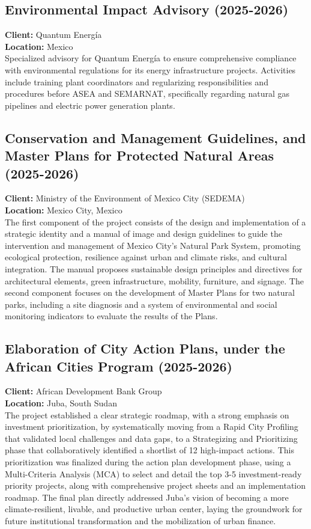 \documentclass[
	a4paper,
	12pt,
	unnumberedsections,
]{CSSullivanBusinessReport}
\begin{document}
\subsection{Environmental Impact Advisory (2025-2026)}
\textbf{Client:} Quantum Energía\\
\textbf{Location:} Mexico\\[0.5em]
Specialized advisory for Quantum Energía to ensure comprehensive compliance with environmental regulations for its energy infrastructure projects. Activities include training plant coordinators and regularizing responsibilities and procedures before ASEA and SEMARNAT, specifically regarding natural gas pipelines and electric power generation plants.

\subsection{Conservation and Management Guidelines, and Master Plans for Protected Natural Areas (2025-2026)}
\textbf{Client:} Ministry of the Environment of Mexico City (SEDEMA)\\
\textbf{Location:} Mexico City, Mexico\\[0.5em]
The first component of the project consists of the design and implementation of a strategic identity and a manual of image and design guidelines to guide the intervention and management of Mexico City’s Natural Park System, promoting ecological protection, resilience against urban and climate risks, and cultural integration. The manual proposes sustainable design principles and directives for architectural elements, green infrastructure, mobility, furniture, and signage. The second component focuses on the development of Master Plans for two natural parks, including a site diagnosis and a system of environmental and social monitoring indicators to evaluate the results of the Plans.

\subsection{Elaboration of City Action Plans, under the African Cities Program (2025-2026)}
\textbf{Client:}  African Development Bank Group \\
\textbf{Location:}   Juba, South Sudan \\[0.5em]
 The project established a clear strategic roadmap, with a strong emphasis on investment prioritization, by systematically moving from a Rapid City Profiling that validated local challenges and data gaps, to a Strategizing and Prioritizing phase that collaboratively identified a shortlist of 12 high-impact actions. This prioritization was finalized during the action plan development phase, using a Multi-Criteria Analysis (MCA) to select and detail the top 3-5 investment-ready priority projects, along with comprehensive project sheets and an implementation roadmap. The final plan directly addressed Juba’s vision of becoming a more climate-resilient, livable, and productive urban center, laying the groundwork for future institutional transformation and the mobilization of urban finance.
\end{document}
